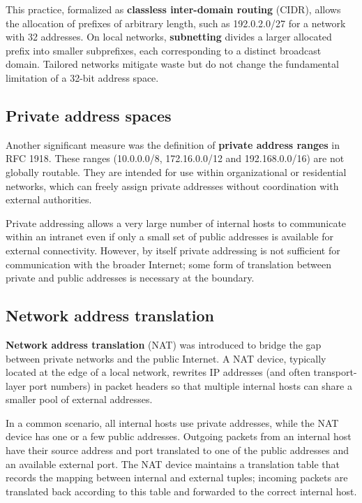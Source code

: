 \documentclass[11pt,a4paper,openany]{report}
\begin{document}
This practice, formalized as \textbf{classless inter-domain routing} (CIDR), allows the allocation of prefixes of arbitrary length, such as 192.0.2.0/27 for a network with 32 addresses. On local networks, \textbf{subnetting} divides a larger allocated prefix into smaller subprefixes, each corresponding to a distinct broadcast domain. Tailored networks mitigate waste but do not change the fundamental limitation of a 32-bit address space.

\subsection{Private address spaces}

Another significant measure was the definition of \textbf{private address ranges} in RFC 1918. These ranges (10.0.0.0/8, 172.16.0.0/12 and 192.168.0.0/16) are not globally routable. They are intended for use within organizational or residential networks, which can freely assign private addresses without coordination with external authorities.

Private addressing allows a very large number of internal hosts to communicate within an intranet even if only a small set of public addresses is available for external connectivity. However, by itself private addressing is not sufficient for communication with the broader Internet; some form of translation between private and public addresses is necessary at the boundary.

\subsection{Network address translation}

\textbf{Network address translation} (NAT) was introduced to bridge the gap between private networks and the public Internet. A NAT device, typically located at the edge of a local network, rewrites IP addresses (and often transport-layer port numbers) in packet headers so that multiple internal hosts can share a smaller pool of external addresses.

In a common scenario, all internal hosts use private addresses, while the NAT device has one or a few public addresses. Outgoing packets from an internal host have their source address and port translated to one of the public addresses and an available external port. The NAT device maintains a translation table that records the mapping between internal and external tuples; incoming packets are translated back according to this table and forwarded to the correct internal host.
\end{document}
